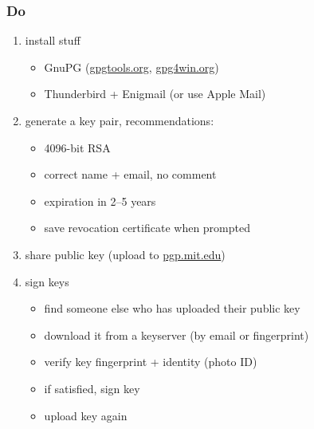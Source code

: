 \documentclass{beamer}
\begin{document}
\begin{frame}
  \frametitle{Do}

  \begin{enumerate}
    \item install stuff
      \begin{itemize}
        \item GnuPG (\url{gpgtools.org}, \url{gpg4win.org})
        \item Thunderbird + Enigmail (or use Apple Mail)
      \end{itemize}
    \item generate a key pair, recommendations:
      \begin{itemize}
        \item 4096-bit RSA
        \item correct name + email, no comment
        \item expiration in 2--5 years
        \item save revocation certificate when prompted
      \end{itemize}
    \item share public key (upload to \url{pgp.mit.edu})
    \item sign keys
      \begin{itemize}
        \item find someone else who has uploaded their public key
        \item download it from a keyserver (by email or fingerprint)
        \item verify key fingerprint + identity (photo ID)
        \item if satisfied, sign key
        \item upload key again
      \end{itemize}
  \end{enumerate}

\end{frame}
\end{document}
